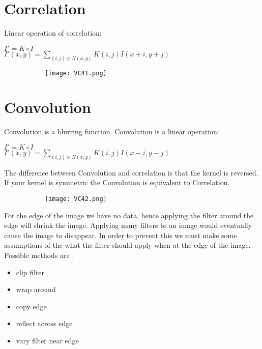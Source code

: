 \documentclass[8pt]{extreport}
\begin{document}
\section{Correlation}

Linear operation of correlation:
\begin{center}
$I' = K \circ I$\\
$I'(x,y) = \displaystyle \sum_{(i,j) \in N(x,y)} K(i,j)I(x+i,y+j)$
\end{center}

\begin{figure}[H]
\centering
\begin{subfigure}[b]{0.32\linewidth}
\texttt{[image: VC41.png]}
\end{subfigure}
\end{figure}

\section{Convolution}

Convolution is a blurring function. Convolution is a linear operation:
\begin{center}
$I' = K \circ I$\\
$I'(x,y) = \displaystyle \sum_{(i,j) \in N(x,y)} K(i,j)I(x-i,y-j)$
\end{center}

The difference between Convolution and correlation is that the kernel is reversed. If your kernel is symmetric the Convolution is equivalent to Correlation.

\begin{figure}[H]
\centering
\begin{subfigure}[b]{0.32\linewidth}
\texttt{[image: VC42.png]}
\end{subfigure}
\end{figure}

For the edge of the image we have no data, hence applying the filter around the edge will shrink the image. Applying many filters to an image would eventually cause the image to disappear. In order to prevent this we must make some assumptions of the what the filter should apply when at the edge of the image. Possible methods are :
\begin{itemize}
\item clip filter
\item wrap around
\item copy edge
\item reflect across edge
\item vary filter near edge
\end{itemize}
\end{document}
